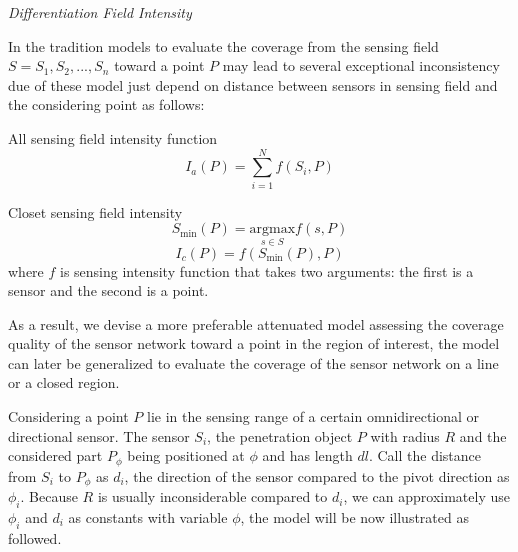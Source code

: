 \begin{df}
	{\itshape Differentiation Field Intensity}
\end{df}
In the tradition models to evaluate the coverage from the sensing field $S=S_1, S_2,..., S_n$ toward a point $P$ may lead to several exceptional inconsistency due of these model just depend on distance between sensors in sensing field and the considering point \cite{megerian2002exposure} as follows:\par
All sensing field intensity function
\begin{equation}
\label{equa:01}
I_a(P) = \sum\limits_{i = 1}^N {f({S_i},P)} 
\end{equation}

Closet sensing field intensity
\begin{equation}
\label{equa:02}
S_{\text{min}}(P) = \underset{s \in S}{\text{argmax}}f(s, P)
\end{equation}
\begin{equation}
\label{equa:03}
I_c(P) = f({S_{\min}(P)},P)
\end{equation}
where $f$ is sensing intensity function that takes two arguments: the first is a sensor and the second is a point.

As a result, we devise a more preferable attenuated model assessing the coverage quality of the sensor network toward a point in the region of interest, the model can later be generalized to evaluate the coverage of the sensor network on a line or a closed region.

Considering a point $P$ lie in the sensing range of a certain omnidirectional or directional sensor. The sensor $S_i$, the penetration object $P$ with radius $R$ and the considered part $P_\phi$ being positioned at $\phi$ and has length $dl$. Call the distance from $S_i$ to $P_\phi$ as $d_i$, the direction of the sensor compared to the pivot direction as $\phi_i$. Because $R$ is usually inconsiderable compared to $d_i$, we can approximately use $\phi_i$ and $d_i$ as constants with variable $\phi$, the model will be now illustrated as followed.

